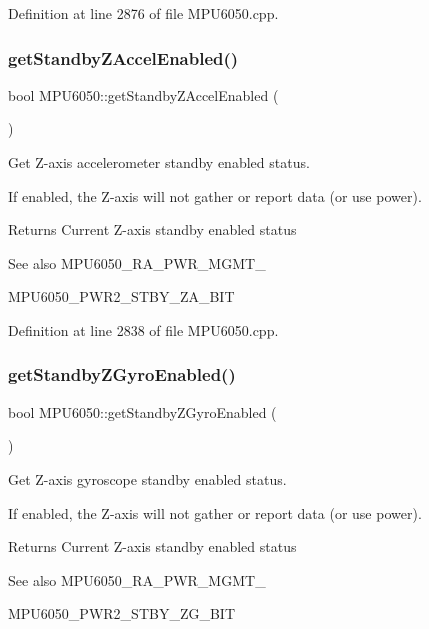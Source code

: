 Definition at line 2876 of file M\+P\+U6050.\+cpp.

\mbox{\label{classMPU6050_adae85612e047c4c7f0c3b7110fc92956}} 
\subsubsection{\texorpdfstring{getStandbyZAccelEnabled()}{getStandbyZAccelEnabled()}}
{\footnotesize\ttfamily bool M\+P\+U6050\+::get\+Standby\+Z\+Accel\+Enabled (\begin{DoxyParamCaption}{ }\end{DoxyParamCaption})}



Get Z-\/axis accelerometer standby enabled status. 

If enabled, the Z-\/axis will not gather or report data (or use power). \begin{DoxyReturn}{Returns}
Current Z-\/axis standby enabled status 
\end{DoxyReturn}
\begin{DoxySeeAlso}{See also}
M\+P\+U6050\+\_\+\+R\+A\+\_\+\+P\+W\+R\+\_\+\+M\+G\+M\+T\+\_ 

M\+P\+U6050\+\_\+\+P\+W\+R2\+\_\+\+S\+T\+B\+Y\+\_\+\+Z\+A\+\_\+\+B\+IT 
\end{DoxySeeAlso}


Definition at line 2838 of file M\+P\+U6050.\+cpp.

\mbox{\label{classMPU6050_a20f7804db1a980a3c425ae44c33d420b}} 
\subsubsection{\texorpdfstring{getStandbyZGyroEnabled()}{getStandbyZGyroEnabled()}}
{\footnotesize\ttfamily bool M\+P\+U6050\+::get\+Standby\+Z\+Gyro\+Enabled (\begin{DoxyParamCaption}{ }\end{DoxyParamCaption})}



Get Z-\/axis gyroscope standby enabled status. 

If enabled, the Z-\/axis will not gather or report data (or use power). \begin{DoxyReturn}{Returns}
Current Z-\/axis standby enabled status 
\end{DoxyReturn}
\begin{DoxySeeAlso}{See also}
M\+P\+U6050\+\_\+\+R\+A\+\_\+\+P\+W\+R\+\_\+\+M\+G\+M\+T\+\_ 

M\+P\+U6050\+\_\+\+P\+W\+R2\+\_\+\+S\+T\+B\+Y\+\_\+\+Z\+G\+\_\+\+B\+IT 
\end{DoxySeeAlso}


